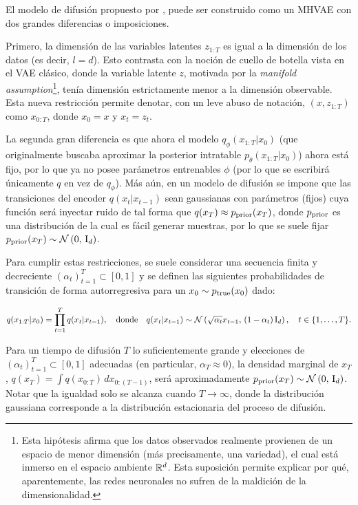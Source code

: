 El modelo de difusión propuesto por \cite{ho2020denoising}, puede ser construido como un MHVAE con dos grandes diferencias o imposiciones.

Primero, la dimensión de las variables latentes $z_{1:T}$ es igual a la dimensión de los datos (es decir, $l=d$). Esto contrasta con la noción de cuello de botella vista en el VAE clásico, donde la variable latente $z$, motivada por la \textit{manifold assumption}\footnote{Esta hipótesis afirma que los datos observados realmente provienen de un espacio de menor dimensión (más precisamente, una variedad), el cual está inmerso en el espacio ambiente $\mathbb{R}^d$. Esta suposición permite explicar por qué, aparentemente, las redes neuronales no sufren de la maldición de la dimensionalidad.}, tenía dimensión estrictamente menor a la dimensión observable. Esta nueva restricción permite denotar, con un leve abuso de notación, $(x, z_{1:T})$ como $x_{0:T}$, donde $x_0=x$ y $x_t=z_t$.

La segunda gran diferencia es que ahora el modelo $q_\phi(x_{1:T}|x_0)$ (que originalmente buscaba aproximar la posterior intratable $p_\theta(x_{1:T}|x_0)$) ahora está fijo, por lo que ya no posee parámetros entrenables $\phi$ (por lo que se escribirá únicamente $q$ en vez de $q_\phi$). Más aún, en un modelo de difusión se impone que las transiciones del encoder $q(x_t|x_{t-1})$ sean gaussianas con parámetros (fijos) cuya función será inyectar ruido de tal forma que $q(x_T)\approx p_{\operatorname{prior}}(x_T)$, donde $p_{\operatorname{prior}}$ es una distribución de la cual es fácil generar muestras, por lo que se suele fijar $p_{\operatorname{prior}}(x_T)\sim\mathcal{N}\left(0,\,\operatorname{I}_{d}\right)$.

Para cumplir estas restricciones, se suele considerar una secuencia finita y decreciente $(\alpha_t)_{t=1}^T\subset[0,1]$ y se definen las siguientes probabilidades de transición de forma autorregresiva para un $x_0\sim p_{\operatorname{true}}(x_0)$ dado:

\begin{equation}
    \label{eq:ddpm_forward}
    q(x_{1:T}|x_0) = \prod_{t=1}^{T} q(x_t|x_{t-1}),
    \quad\text{donde}\quad
    q(x_t|x_{t-1}) \sim \mathcal{N}\left(\sqrt{\alpha_t} x_{t-1},\,(1-\alpha_t)\operatorname{I}_{d}\right),
    \quad t\in\{1,\ldots,T\}.
\end{equation}

Para un tiempo de difusión $T$ lo suficientemente grande y elecciones de $(\alpha_t)_{t=1}^T\subset[0,1]$ adecuadas (en particular, $\alpha_T\approx 0$), la densidad marginal de $x_T$, $q(x_T)=\int q(x_{0:T})\, dx_{0:(T-1)}$, será aproximadamente $p_{\operatorname{prior}}(x_T)\sim\mathcal{N}\left(0,\,\operatorname{I}_{d}\right)$. Notar que la igualdad solo se alcanza cuando $T\to\infty$, donde la distribución gaussiana corresponde a la distribución estacionaria del proceso de difusión.

